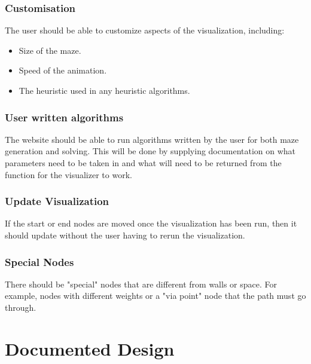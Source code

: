 \documentclass[titlepage]{article}
\begin{document}
\subsubsection{Customisation}
The user should be able to customize aspects of the visualization, including:
\begin{itemize}
    \item Size of the maze.
    \item Speed of the animation.
    \item The heuristic used in any heuristic algorithms.
\end{itemize}

\subsubsection{User written algorithms}
The website should be able to run algorithms written by the user for both maze generation and solving. This will be done by supplying documentation on what parameters need to be taken in and what will need to be returned from the function for the visualizer to work.

\subsubsection{Update Visualization}
If the start or end nodes are moved once the visualization has been run, then it should update without the user having to rerun the visualization.

\subsubsection{Special Nodes}
There should be "special" nodes that are different from walls or space. For example, nodes with different weights or a "via point" node that the path must go through.

\section{Documented Design}
\end{document}
